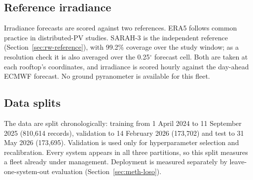 \subsection{Reference irradiance}
\label{sec:data-ref}

Irradiance forecasts are scored against two references. ERA5 \citep{Hersbach2020} follows common practice in distributed-PV studies. SARAH-3 \citep{Pfeifroth2024,Pfeifroth2023} is the independent reference (Section~\ref{sec:rw-reference}), with 99.2\% coverage over the study window; as a resolution check it is also averaged over the 0.25$^\circ$ forecast cell. Both are taken at each rooftop's coordinates, and irradiance is scored hourly against the day-ahead ECMWF forecast. No ground pyranometer is available for this fleet.

\subsection{Data splits}
\label{sec:data-splits}

The data are split chronologically: training from 1 April 2024 to 11 September 2025 (810,614 records), validation to 14 February 2026 (173,702) and test to 31 May 2026 (173,695). Validation is used only for hyperparameter selection and recalibration. Every system appears in all three partitions, so this split measures a fleet already under management. Deployment is measured separately by leave-one-system-out evaluation (Section~\ref{sec:meth-loso}).
